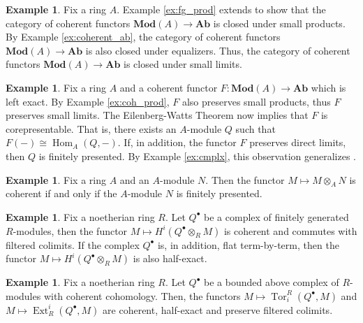 \documentclass{amsart}
\theoremstyle{plain}
\theoremstyle{definition}
\newtheorem{ex}[thm]{Example}
\theoremstyle{remark}
\numberwithin{equation}{section}
\newcommand{\MOD}[1]{\mathbf{Mod}({#1})}
\DeclareMathOperator{\Hom}{Hom}
\DeclareMathOperator{\Ext}{Ext}
\DeclareMathOperator{\Tor}{Tor}
\newcommand{\tensor}{\otimes}
\newcommand{\AB}{\mathbf{Ab}}
\begin{document}
\begin{ex}\label{ex:coh_lims}
  Fix a ring $A$. Example \ref{ex:fg_prod} extends to show that the
  category of coherent functors $\MOD{A} \to \AB$ is closed under
  small products. By Example \ref{ex:coherent_ab}, the category of
  coherent functors $\MOD{A} \to \AB$ is also closed under
  equalizers. Thus, the category of coherent functors $\MOD{A} \to
  \AB$ is closed under small limits. 
\end{ex}
\begin{ex}\label{ex:left_exact_coh}
  Fix a ring $A$ and a coherent functor $F : \MOD{A} \to
  \AB$ which is left exact. By Example \ref{ex:coh_prod}, $F$ also
  preserves small products, thus $F$ preserves small 
  limits. The Eilenberg-Watts Theorem \cite[Thm.\
  6]{MR0118757} now implies that $F$ is corepresentable. That is, there
  exists an $A$-module $Q$ such that $F(-) \cong \Hom_A(Q,-)$. If, in
  addition, the functor $F$ preserves direct limits, then $Q$ is
  finitely presented. By Example \ref{ex:cmplx}, this observation
  generalizes \cite[III.7.4.6]{EGA}.  
\end{ex}
\begin{ex}
  Fix a ring $A$ and an $A$-module $N$. Then the functor $M\mapsto
  M\tensor_A N$ is coherent if and only if the $A$-module $N$ is
  finitely presented.
\end{ex}
\begin{ex}\label{ex:noetheriancmplx}
  Fix a noetherian ring $R$. Let $Q^\bullet$ be a complex of finitely
  generated $R$-modules, then the functor $M\mapsto
  H^i(Q^\bullet\tensor_R M)$ is coherent and commutes with filtered
  colimits. If the complex 
  $Q^\bullet$ is, in addition, flat term-by-term, then the
  functor $M\mapsto H^i(Q^\bullet\tensor_R M)$ is also half-exact.  
\end{ex}
\begin{ex}\label{ex:noetheriantorext}
  Fix a noetherian ring $R$. Let $Q^\bullet$ be a bounded above
  complex of $R$-modules with coherent cohomology. Then, the functors
  $M\mapsto \Tor_{i}^R(Q^\bullet, M)$ and $M\mapsto 
  \Ext^i_R(Q^\bullet,M)$ are coherent, half-exact and preserve
  filtered colimits. 
\end{ex}
\end{document}
